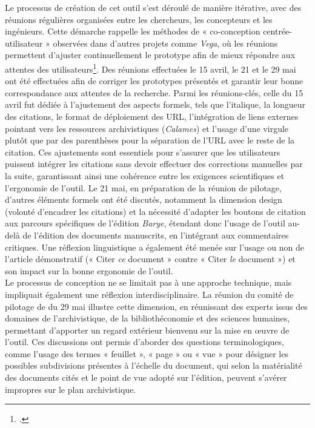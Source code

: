 Le processus de création de cet outil s’est déroulé de manière itérative, avec des réunions régulières organisées entre les chercheurs, les concepteurs et les ingénieurs. Cette démarche rappelle les méthodes de « co-conception centrée-utilisateur » observées dans d’autres projets comme \textit{Vega}, où les réunions permettent d’ajuster continuellement le prototype afin de mieux répondre aux attentes des utilisateurs\footcite{vial_tournant_2016}. Des réunions effectuées le 15 avril, le 21 et le 29 mai ont été effectuées afin de corriger les prototypes présentés et garantir leur bonne correspondance aux attentes de la recherche.
Parmi les réunions-clés, celle du 15 avril fut dédiée à l’ajustement des aspects formels, tels que l’italique, la longueur des citations, le format de déploiement des URL, l’intégration de liens externes pointant vers les ressources archivistiques (\textit{Calames}) et l’usage d’une virgule plutôt que par des parenthèses pour la séparation de l’URL avec le reste de la citation. Ces ajustements sont essentiels pour s’assurer que les utilisateurs puissent intégrer les citations sans devoir effectuer des corrections manuelles par la suite, garantissant ainsi une cohérence entre les exigences scientifiques et l’ergonomie de l’outil.
Le 21 mai, en préparation de la réunion de pilotage, d’autres éléments formels ont été discutés, notamment la dimension design (volonté d’encadrer les citations) et la nécessité d’adapter les boutons de citation aux parcours spécifiques de l’édition \textit{Barye}, étendant donc l’usage de l’outil au-delà de l’édition des documents manuscrits, en l’intégrant aux commentaires critiques. Une réflexion linguistique a également été menée sur l’usage ou non de l’article démonstratif (« Citer \textit{ce} document » contre « Citer \textit{le} document ») et son impact sur la bonne ergonomie de l’outil. 
\newline
{}\\

Le processus de conception ne se limitait pas à une approche technique, mais impliquait également une réflexion interdisciplinaire. La réunion du comité de pilotage de \pense du 29 mai illustre cette dimension, en réunissant des experts issus des domaines de l’archivistique, de la bibliothéconomie et des sciences humaines, permettant d’apporter un regard extérieur bienvenu sur la mise en œuvre de l’outil. Ces discussions ont permis d’aborder des questions terminologiques, comme l’usage des termes « feuillet », « page » ou « vue » pour désigner les possibles subdivisions présentes à l’échelle du document, qui selon la matérialité des documents cités et le point de vue adopté sur l’édition, peuvent s’avérer impropres sur le plan archivistique. 

